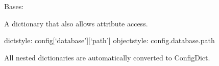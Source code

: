 \documentclass[letterpaper,10pt,english]{sphinxmanual}
\begin{document}
\begin{fulllineitems}
\label{\detokenize{core.config_loader:core.config_loader.ConfigDict}}
\pysigstartsignatures
\pysiglinewithargsret
{}
{\sphinxparamcomma {}}
{}
\pysigstopsignatures
\sphinxAtStartPar
Bases: 

\sphinxAtStartPar
A dictionary that also allows attribute access.
\begin{description}
\sphinxAtStartPar
dict\sphinxhyphen{}style: config{[}‘database’{]}{[}‘path’{]}
object\sphinxhyphen{}style: config.database.path

\end{description}

\sphinxAtStartPar
All nested dictionaries are automatically converted to ConfigDict.

\end{fulllineitems}

\end{document}
